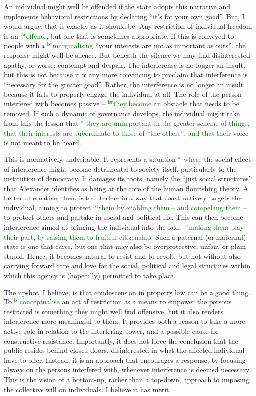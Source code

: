 \documentclass[12pt,a4paper]{book} %
\newcommand{\isr}[1]{\textcolor{green}{$^{\textrm{isr}}${#1}}}
\begin{document}
An individual might well be offended if the state adopts this narrative and implements behavioral restrictions by declaring ``it's for your own good''. But, I would argue, that is exactly as it should be. Any restriction of individual freedom is an \isr{offence}, but one that is sometimes appropriate. If this is conveyed to people with a \isr{marginalising} ``your interests are not as important as ours'', the response might well be silence. But beneath the silence we may find disinterested apathy, or worse: contempt and despair. The interference is no longer an insult, but this is not because it is any more convincing to proclaim that interference is ``necessary for the greater good''. Rather, the interference is no longer an insult because it fails to properly engage the individual at all. The role of the person interfered with becomes passive -- \isr{they become} an obstacle that needs to be removed. If such a dynamic of governance develops, the individual might take from this the lesson that \isr{they are unimportant in the greater scheme of things, that their interests are subordinate to those of ``the others'', and that their} voice is not meant to be heard.

This is normatively undesirable. It represents a situation \isr{where} the social effect of interference might become detrimental to society itself, particularly to the institution of democracy. It damages its roots, namely the ``just social structures'' that Alexander identifies as being at the core of the human flourishing theory. A better alternative, then, is to interfere in a way that constructively targets the individual, aiming to protect \isr{them by enabling them -- and compelling them --} to protect others and partake in social and political life. This can then become interference aimed at bringing the individual into the fold, \isr{making them play their part, by raising them to fruitful citizenship.} Such a paternal (or maternal) state is one that cares, but one that may also be overprotective, unfair, or plain stupid. Hence, it becomes natural to resist and to revolt, but not without also carrying forward care and love for the social, political and legal structures within which this agency is (hopefully) permitted to take place.

The upshot, I believe, is that condescension in property law can be a good thing. To \isr{conceptualise} an act of restriction as a means to empower the persons restricted is something they might well find offensive, but it also renders interference more meaningful to them. It provides both a reason to take a more active role in relation to the interfering power, and a possible cause for constructive resistance. Importantly, it does not force the conclusion that the public resides behind closed doors, disinterested in what the affected individual have to offer. Instead, it is an approach that encourages a response, by focusing always on the persons interfered with, whenever interference is deemed necessary. This is the vision of a bottom-up, rather than a top-down, approach to imposing the collective will on individuals. I believe it has merit. 
\end{document}
